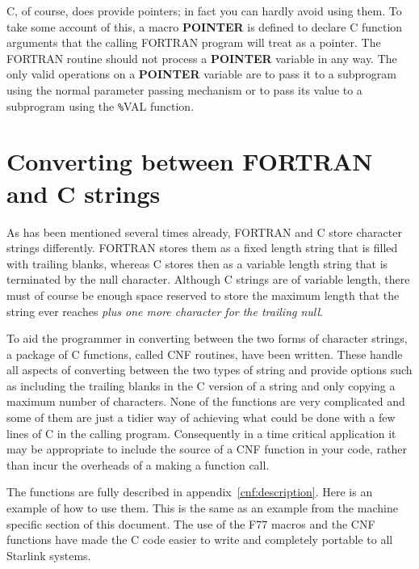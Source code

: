 C, of course, does provide pointers; in fact you can hardly avoid using them.
To take some account of this, a macro {\bf POINTER} is defined to declare C
function arguments that the calling FORTRAN program will treat as a pointer.
The FORTRAN routine should not process a {\bf POINTER} variable in any way. The
only valid operations on a {\bf POINTER} variable are to pass it to a
subprogram using the normal parameter passing mechanism or to pass its value to
a subprogram using the {\tt \%}VAL function.

\section{Converting between FORTRAN and C strings}
\label{cnf}

As has been mentioned several times already, FORTRAN and C store character
strings differently. FORTRAN stores them as a fixed length string that is filled
with trailing blanks, whereas C stores then as a variable length string that is
terminated by the null character. Although C strings are of variable length,
there must of course be enough space reserved to store the maximum length that
the string ever reaches {\em plus one more character for the trailing null}.

To aid the programmer in converting between the two forms of character strings,
a package of C functions, called CNF routines, have been written. These
handle all aspects of converting between the two types of string and provide
options such as including the trailing blanks in the C version of a string and
only copying a maximum number of characters. None of the functions are very
complicated and some of them are just a tidier way of achieving what could be
done with a few lines of C in the calling program. Consequently in a time
critical application it may be appropriate to include the source of a CNF
function in your code, rather than incur the overheads of a making a function
call.

The functions are fully described in appendix~\ref{cnf:description}. Here is an
example of how to use them. This is the same as an example from the machine
specific section of this document. The use of the F77 macros and the CNF
functions have made the C code easier to write and completely portable to all
Starlink systems.

